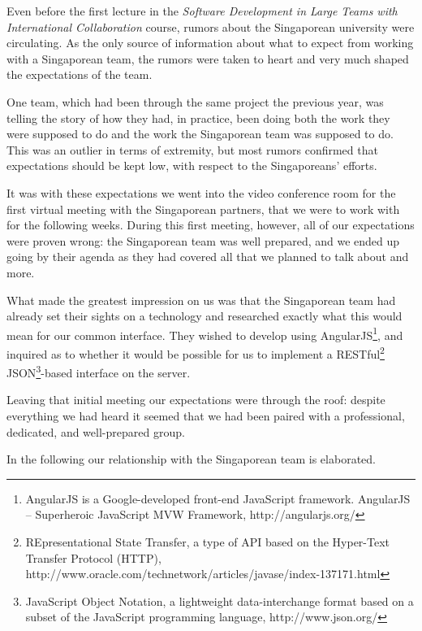 Even before the first lecture in the \emph{Software
Development in Large Teams with International Collaboration} course, rumors
about the Singaporean university were circulating. As the only source of
information about what to expect from working with a Singaporean team, the
rumors were taken to heart and very much shaped the expectations of the team.

One team, which had been through the same project the previous year, was telling
the story of how they had, in
practice, been doing both the work they were supposed to do and the work the
Singaporean team was supposed to do. This was an outlier in terms of extremity,
but most rumors confirmed that expectations should be kept low, with respect to
the Singaporeans' efforts.

It was with these expectations we went into the video conference room for the
first virtual meeting with the Singaporean partners, that we were to work with
for the following weeks. During this first meeting, however, all of our
expectations were proven wrong: the Singaporean team was well prepared, and we
ended up going by their agenda as they had covered all that we planned to talk
about and more.

What made the greatest impression on us was that the Singaporean team had
already set their sights on a technology and researched exactly what this would
mean for our common interface. They wished to develop using
AngularJS\footnote{AngularJS is a Google-developed front-end JavaScript
framework. AngularJS – Superheroic JavaScript MVW Framework,
http://angularjs.org/}, and inquired as to whether it would be possible for us
to implement a RESTful\footnote{REpresentational State Transfer, a type of API
based on the Hyper-Text Transfer Protocol (HTTP),
http://www.oracle.com/technetwork/articles/javase/index-137171.html}
JSON\footnote{ JavaScript Object Notation, a lightweight data-interchange format
based on a subset of the JavaScript programming language,
http://www.json.org/}-based interface on the server.

Leaving that initial meeting our expectations were through the roof: despite
everything we had heard it seemed that we had been paired with a professional,
dedicated, and well-prepared group.

In the following our relationship with the Singaporean team is elaborated.
